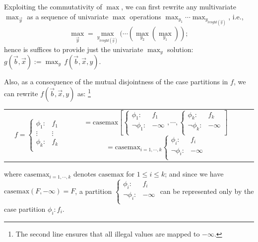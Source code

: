 \documentclass[twoside,11pt]{article}
\newcommand{\casemax}{\mathrm{casemax}}
\begin{document}
Exploiting the commutativity of $\max$, we can first rewrite any multivariate $\max_{\vec{y}}$ as a sequence of univariate $\max$ operations 
$\max_{y_1} \cdots \max_{y_{\textit{lenght}(\vec{y})}}$, i.e., 
$$\max_{\vec{y}}= \max_{y_{\textit{lenght}(\vec{y})}} (\cdots (\max_{y_2}(\max_{y_1}));$$ hence is suffices to provide just the univariate $\max_{y}$ solution: $g(\vec{b},\vec{x}) := \max_{y}
\, f(\vec{b},\vec{x},y)$.

Also, as a consequence of the mutual disjointness of the case partitions in $f$, we can rewrite $f(\vec{b},\vec{x},y)$ as: \footnote{The second line ensures that all illegal values are mapped to $-\infty$.}

{%
\begin{center}
\begin{tabular}{r c c l}
&
\hspace{-6mm} 
  $f = \begin{cases}
    \phi_1: & f_1 \\ 
   \vdots&\vdots\\ 
    \phi_k: & f_k \\ 
  \end{cases}$
&
\hspace{-2mm}
  $ =  \casemax \left[  \begin{cases}
    \phi_1: & f_1 \\
    \neg \phi_1: & -\infty \\    
  \end{cases}, 
  \cdots ,
  \begin{cases}
    \phi_k: & f_k \\
    \neg \phi_k: & -\infty \\    
  \end{cases}   
  \right]$
  \hspace{-2mm}
  $ = \casemax_{i=1,\cdots,k}\begin{cases}
    \phi_i: & f_i \\
    \neg \phi_i: & -\infty \\    
  \end{cases}$
  
\end{tabular}
\end{center}
}
where $\casemax_{i=1,\cdots,k}$ denotes $\casemax$ for $1\leq i \leq k$; and since we have $\casemax(F, -\infty) = F$, a partition 
$ \begin{cases}
    \phi_i: & f_i \\
    \neg \phi_i: & -\infty \\    
  \end{cases}$ can be represented only by the case partition $\phi_i : f_i$.   
\end{document}
